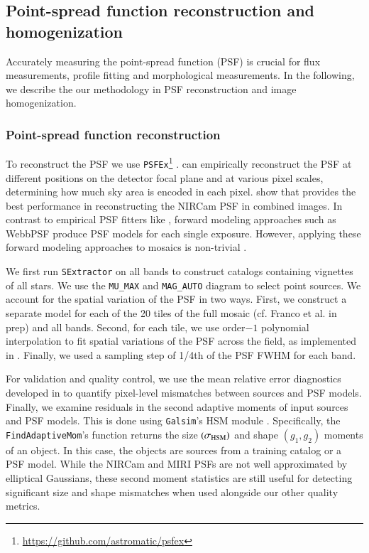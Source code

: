 \documentclass[longauth]{aa}
\begin{document}
\subsection{Point-spread function reconstruction and homogenization} \label{sec:PSF-reconstruct-homogenize}

Accurately measuring the point-spread function (PSF) is crucial for flux measurements, profile fitting and morphological measurements. In the following, we describe the our methodology in PSF reconstruction and image homogenization.

\subsubsection{Point-spread function reconstruction} \label{sec:PSFEx-reconstruction}

To reconstruct the PSF we use \texttt{PSFEx}\footnote{\url{https://github.com/astromatic/psfex}} \citep{Bertin2011}. \psfex can  empirically reconstruct the PSF at different positions on the detector focal plane and at various pixel scales, determining how much sky area is encoded in each pixel. \cite{berman2024efficient} show that \psfex provides the best performance in reconstructing the NIRCam PSF in combined images. In contrast to empirical PSF fitters like \psfex, forward modeling approaches such as WebbPSF \citep{2014SPIE} produce PSF models for each single exposure. However, applying these forward modeling approaches to mosaics is non-trivial \citep{jwstcalibrationpipeline2023,harvey2024weak}. 
 
We first run \texttt{SExtractor} on all bands to construct catalogs containing vignettes of all stars. We use the \texttt{MU\_MAX} and \texttt{MAG\_AUTO} diagram \citep{leauthaud_weak_2007} to select point sources. We account for the spatial variation of the PSF in two ways. First, we construct a separate model for each of the 20 tiles of the full mosaic (cf. Franco et al. in prep) and all bands. Second, for each tile, we use order$-1$ polynomial interpolation to fit spatial variations of the PSF across the field, as implemented in \psfex. Finally, we used a sampling step of 1/4th of the PSF FWHM for each band.
 
For validation and quality control, we use the mean relative error diagnostics developed in \cite{berman2024efficient} to quantify pixel-level mismatches between sources and PSF models. Finally, we examine residuals in the second adaptive moments \citep{hirata2003shear,mandelbaum2005systematic} of input sources and PSF models. This is done using \texttt{Galsim}'s HSM module \citep{rowe2015galsim}. Specifically, the \texttt{FindAdaptiveMom}'s function returns the size $(\sigma_{\textsc{HSM}})$ and shape $(g_1, g_2)$ moments of an object. In this case, the objects are sources from a training catalog or a PSF model. While the NIRCam and MIRI PSFs are not well approximated by elliptical Gaussians, these second moment statistics are still useful for detecting significant size and shape mismatches when used alongside our other quality metrics. 
\end{document}
